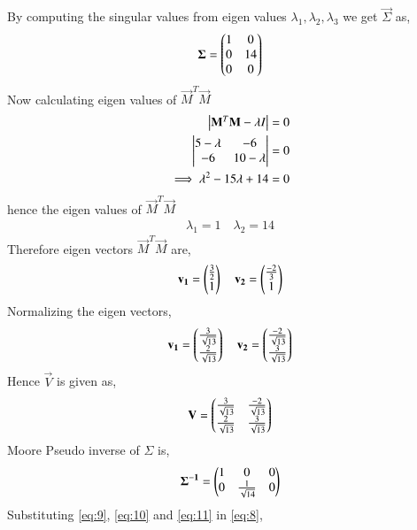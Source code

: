 \documentclass[journal,12pt,twocolumn]{IEEEtran}
\begin{document}
By computing the singular values from eigen values $\lambda_1, \lambda_2, \lambda_3$ we get $\vec{\Sigma}$ as,
\begin{align}
\mathbf{\Sigma} = \begin{pmatrix}1&0\\0&14\\0&0\end{pmatrix}
\end{align}
Now calculating eigen values of $\vec{M}^T\vec{M}$
\begin{align}
\begin{vmatrix}\mathbf{M}^T\mathbf{M}-\lambda I\end{vmatrix}=0\\
\begin{vmatrix}5-\lambda&-6\\-6&10-\lambda\end{vmatrix}=0\\
\implies\lambda^2-15\lambda+14 =0
\end{align}
hence the eigen values of $\vec{M}^T\vec{M}$
\begin{align}
\lambda_1 = 1 \quad \lambda_2 =14
\end{align}
Therefore eigen vectors $\vec{M}^T\vec{M}$ are,
\begin{align}
\mathbf{v_1}=\begin{pmatrix}\frac{3}{2}\\1\end{pmatrix}\quad \mathbf{v_2}=\begin{pmatrix}\frac{-2}{3}\\1\end{pmatrix}
\end{align}
Normalizing the eigen vectors,
\begin{align}
\mathbf{v_1}=\begin{pmatrix}\frac{3}{\sqrt{13}}\\\frac{2}{\sqrt{13}}\end{pmatrix} \quad
\mathbf{v_2}=\begin{pmatrix}\frac{-2}{\sqrt{13}}\\\frac{3}{\sqrt{13}}\end{pmatrix}
\end{align}
Hence $\vec{V}$ is given as,
\begin{align}
\mathbf{V}= \begin{pmatrix}\frac{3}{\sqrt{13}}&\frac{-2}{\sqrt{13}}\\\frac{2}{\sqrt{13}}&\frac{3}{\sqrt{13}}\end{pmatrix} \label{eq:10}
\end{align}
Moore Pseudo inverse of $\Sigma$ is,
\begin{align}
\mathbf{\Sigma^{-1}} = \begin{pmatrix}1&0&0\\0&\frac{1}{\sqrt{14}}&0\end{pmatrix} \label{eq:11}
\end{align}
Substituting \eqref{eq:9}, \eqref{eq:10} and \eqref{eq:11} in \eqref{eq:8},
\end{document}
